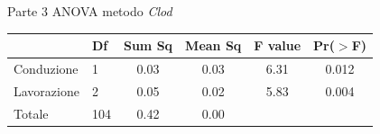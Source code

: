 \documentclass[10pt]{beamer}
\begin{document}
\begin{frame}{Parte 3 \small{ ANOVA metodo \emph{Clod}}}
  \begin{table}
    \centering
    \begin{tabular}{llcccc}
      \hline
                  & Df  & Sum Sq & Mean Sq & F value & Pr($>$F) \\ 
      \hline
      Conduzione  & 1   & 0.03   & 0.03    & 6.31    & 0.012    \\ 
      Lavorazione & 2   & 0.05   & 0.02    & 5.83    & 0.004    \\ 
      Totale      & 104 & 0.42   & 0.00    &         &          \\ 
      \hline
    \end{tabular}
    \label{tab:Anova densita per spinta}
  \end{table}
\end{frame}
\end{document}
